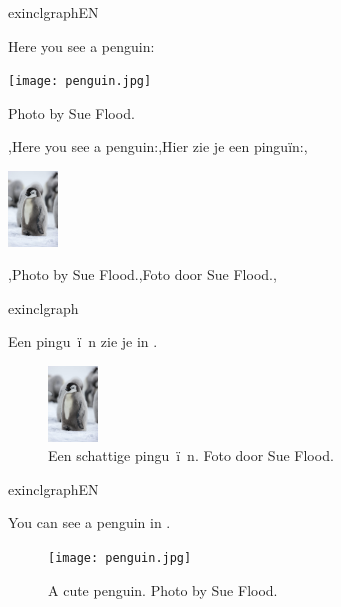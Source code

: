 \documentclass[presentatie.tex]{subfiles}
\begin{document}
\begin{saveblock}{exinclgraphEN}
	\begin{highlightblock}[linewidth=0.95\textwidth,framexleftmargin=0.25em]
		Here you see a penguin:
		\begin{center}
			\texttt{[image: penguin.jpg]}
		\end{center}
		Photo by Sue Flood.
	\end{highlightblock}
\end{saveblock}

\begin{frame}{}
	\vspace{-28px}
	
	\begin{penExResult}
		\lang,Here you see a penguin:,Hier zie je een pinguïn:,
		\begin{center}
			\includegraphics[height=2cm]{assets/pinguin.jpg}
		\end{center}
		\lang,Photo by Sue Flood.,Foto door Sue Flood.,
	\end{penExResult}
\end{frame}

\begin{saveblock}{exinclgraph}
	\begin{highlightblock}[linewidth=0.95\textwidth,framexleftmargin=0.25em]
		Een pingu~\"i~n zie je in .
		\begin{figure}[h]
			\centering
			\includegraphics[height=2cm]{pinguin.jpg}
			\caption{Een schattige pingu~\"i~n. Foto door Sue Flood.}
			\label{fig:pinguin}
		\end{figure}
	\end{highlightblock}
\end{saveblock}

\begin{saveblock}{exinclgraphEN}
	\begin{highlightblock}[linewidth=0.95\textwidth,framexleftmargin=0.25em]
		You can see a penguin in .
		\begin{figure}[h]
			\centering
			\texttt{[image: penguin.jpg]}
			\caption{A cute penguin. Photo by Sue Flood.}
			\label{fig:penguin}
		\end{figure}
	\end{highlightblock}
\end{saveblock}
\end{document}
